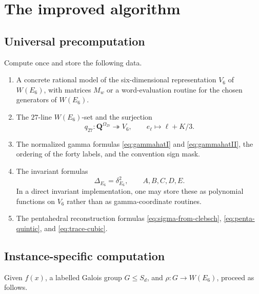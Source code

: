 \documentclass[11pt]{article}
\newcommand{\QQ}{\mathbf{Q}}
\newcommand{\deltaE}{\delta_{E_6}}
\newcommand{\DeltaE}{\Delta_{E_6}}
\newcommand{\W}{W(E_6)}
\newcommand{\V}{V_6}
\begin{document}
\section{The improved algorithm}
\label{sec:improved-algorithm}

\subsection{Universal precomputation}

Compute once and store the following data.

\begin{enumerate}[label=\textbf{U\arabic*.}]
\item A concrete rational model of the six-dimensional representation $\V$ of
$\W$, with matrices $M_w$ or a word-evaluation routine for the chosen generators of
$\W$.

\item The $27$-line $W(E_6)$-set and the surjection
\[
  q_{27}:\QQ^{\Omega_{27}}\twoheadrightarrow \V,
  \qquad
  e_\ell\mapsto \ell+K/3.
\]

\item The normalized gamma formulas \eqref{eq:gammahatI} and
\eqref{eq:gammahatII}, the ordering of the forty labels, and the convention sign
mask.

\item The invariant formulas
\[
  \DeltaE=\deltaE^2,
  \qquad
  A,B,C,D,E.
\]
In a direct invariant implementation, one may store these as polynomial functions
on $\V$ rather than as gamma-coordinate routines.

\item The pentahedral reconstruction formulas
\eqref{eq:sigma-from-clebsch}, \eqref{eq:penta-quintic}, and
\eqref{eq:trace-cubic}.
\end{enumerate}

\subsection{Instance-specific computation}

Given $f(x)$, a labelled Galois group $G\leq S_d$, and
$\rho:G\to\W$, proceed as follows.
\end{document}
